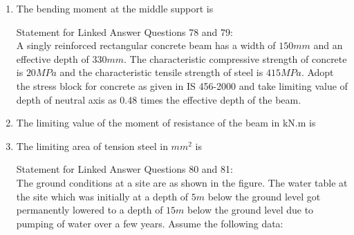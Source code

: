 \documentclass[journal]{IEEEtran}
\begin{document}
\begin{enumerate}[start=74]
\item %
The bending moment at the middle support is 
\begin{enumerate}
\end{enumerate}
Statement for Linked Answer Questions 78 and 79:\\
A singly reinforced rectangular concrete beam has a width of $150 mm$ and an effective depth of $330 mm$. The characteristic compressive strength of concrete is $20 MPa$ and the characteristic tensile strength of steel is $415 MPa$. Adopt the stress block for concrete as given in IS 456-2000 and take limiting value of depth of neutral axis as 0.48 times the effective depth of the beam. 
\item %
The limiting value of the moment of resistance of the beam in kN.m is\\
\begin{enumerate}
\end{enumerate}
\item %
The limiting area of tension steel in $mm^2$ is 
\begin{enumerate}
\end{enumerate}
Statement for Linked Answer Questions 80 and 81:\\
The ground conditions at a site are as shown in the figure. The water table at the site which was initially at a depth of $5m$ below the ground level got permanently lowered to a depth of $15m$ below the ground level due to pumping of water over a few years. Assume the following data: \\

\end{enumerate}
\end{document}
